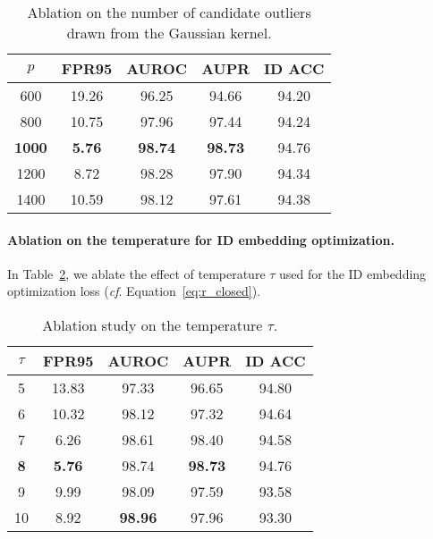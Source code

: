 \begin{table}[h]
  \centering
      \small 
  \vspace{-1em}
  \caption{Ablation on the number of candidate outliers drawn from the Gaussian kernel.}
    \begin{tabular}{c|cccc}
    \toprule
   $p$& FPR95 & AUROC & AUPR  & ID  ACC  \\
    \midrule
    600   & 19.26  & 96.25  & 94.66  & 94.20  \\
    800   & 10.75  & 97.96  & 97.44  & 94.24  \\
    \textbf{1000}  & \textbf{5.76}  & \textbf{98.74}   & \textbf{98.73}  &  94.76  \\
    1200  & 8.72  & 98.28  & 97.90  & 94.34  \\
    1400  & 10.59  & 98.12 & 97.61 & 94.38  \\
    \bottomrule
    \end{tabular}\label{tab:c_ablation}\vspace{-1em}
\end{table}\vspace{-0.2cm}
\paragraph{Ablation on the temperature for ID embedding optimization.}  In Table~\ref{tab:tau}, we ablate the effect of temperature $\tau$ used for the ID embedding optimization loss (\emph{cf}. Equation~\ref{eq:r_closed}).  



 \begin{table}[h]
    \centering
    \small 
    \vspace{-1em}
    \caption{Ablation study on the temperature $\tau$.}
      \begin{tabular}{c|cccc}
      \toprule
      $\tau$     & FPR95 & AUROC & AUPR  & ID  ACC  \\
      \midrule
      5     & 13.83  & 97.33  & 96.65  & 94.80\\
      6     & 10.32  & 98.12  & 97.32  & 94.64  \\
      7     & 6.26  & 98.61  & 98.40  & 94.58  \\
      \textbf{8}     &\textbf{5.76}  & 98.74   & \textbf{98.73}  &  94.76 \\
      9     & 9.99  & 98.09  & 97.59  & 93.58  \\
      10    & 8.92  & \textbf{98.96} & 97.96 & 93.30  \\
      \bottomrule
      \end{tabular}\label{tab:tau}\end{table}


